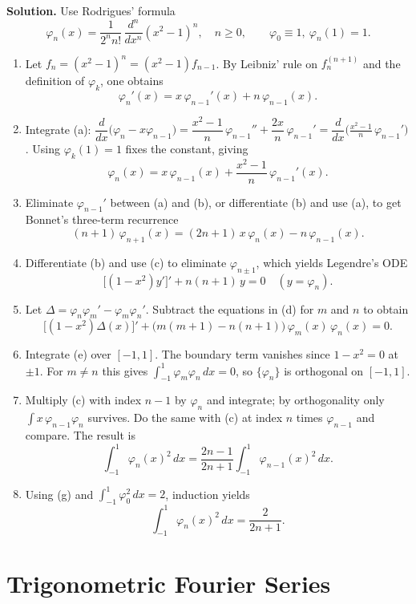 \noindent\textbf{Solution.}
Use Rodrigues' formula
\[
\varphi_n(x)=\frac{1}{2^{n} n!}\,\frac{d^n}{dx^n}(x^2-1)^n,\quad n\ge0,\qquad \varphi_0\equiv1,\ \varphi_n(1)=1.
\]
\begin{enumerate}[label=(\alph*)]
\item Let $f_n=(x^2-1)^n=(x^2-1)f_{n-1}$. By Leibniz' rule on $f_n^{(n+1)}$ and the definition of $\varphi_k$, one obtains
\[
\varphi_n'(x)=x\,\varphi_{n-1}'(x)+n\,\varphi_{n-1}(x).
\]
\item Integrate (a): $\dfrac{d}{dx}\big(\varphi_n - x\varphi_{n-1}\big) = \dfrac{x^2-1}{n}\,\varphi_{n-1}'' + \dfrac{2x}{n}\,\varphi_{n-1}' = \dfrac{d}{dx}\Big( \frac{x^2-1}{n}\,\varphi_{n-1}' \Big)$. Using $\varphi_k(1)=1$ fixes the constant, giving
\[
\varphi_n(x)=x\,\varphi_{n-1}(x)+\frac{x^2-1}{n}\,\varphi_{n-1}'(x).
\]
\item Eliminate $\varphi_{n-1}'$ between (a) and (b), or differentiate (b) and use (a), to get Bonnet's three-term recurrence
\[
(n+1)\,\varphi_{n+1}(x)=(2n+1)\,x\,\varphi_n(x)-n\,\varphi_{n-1}(x).
\]
\item Differentiate (b) and use (c) to eliminate $\varphi_{n\pm1}$, which yields Legendre's ODE
\[
\big[(1-x^2)y'\big]' + n(n+1)\,y=0\quad (y=\varphi_n).
\]
\item Let $\Delta=\varphi_n\varphi_m'-\varphi_m\varphi_n'$. Subtract the equations in (d) for $m$ and $n$ to obtain
\[
\big[(1-x^2)\Delta(x)\big]'+\big(m(m+1)-n(n+1)\big)\,\varphi_m(x)\,\varphi_n(x)=0.
\]
\item Integrate (e) over $[-1,1]$. The boundary term vanishes since $1-x^2=0$ at $\pm1$. For $m\ne n$ this gives $\int_{-1}^1\varphi_m\varphi_n\,dx=0$, so $\{\varphi_n\}$ is orthogonal on $[-1,1]$.
\item Multiply (c) with index $n-1$ by $\varphi_n$ and integrate; by orthogonality only $\int x\,\varphi_{n-1}\varphi_n$ survives. Do the same with (c) at index $n$ times $\varphi_{n-1}$ and compare. The result is
\[
\int_{-1}^1 \varphi_n(x)^2\,dx=\frac{2n-1}{2n+1}\int_{-1}^1 \varphi_{n-1}(x)^2\,dx.
\]
\item Using (g) and $\int_{-1}^1\varphi_0^2\,dx=2$, induction yields
\[
\int_{-1}^1 \varphi_n(x)^2\,dx=\frac{2}{2n+1}.
\]
\end{enumerate}

\section{Trigonometric Fourier Series}

